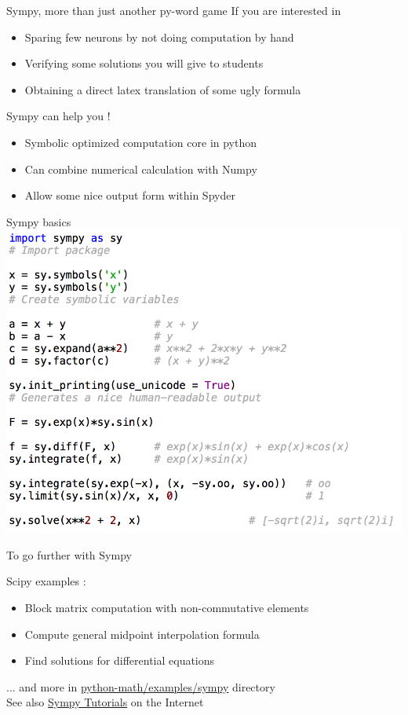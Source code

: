 \documentclass[11pt,unknownkeysallowed,usenames,dvipsnames]{beamer}
\begin{document}
\begin{frame}{Sympy, more than just another py-word game}
    If you are interested in
    \begin{itemize}
        \item Sparing few neurons by not doing computation by hand
        \item Verifying some solutions you will give to students
        \item Obtaining a direct latex translation of some ugly formula 
    \end{itemize}
    \begin{center}
        Sympy can help you !
    \end{center}
    \begin{itemize}
        \item Symbolic optimized computation core in python
        \item Can combine numerical calculation with Numpy
        \item Allow some nice output form within Spyder
    \end{itemize}
\end{frame}

\begin{frame}{Sympy basics}
	\includegraphics[width=0.9\linewidth]{code-sympy}
\end{frame}

\begin{frame}{To go further with Sympy}
	\begin{block}{Scipy examples :}
        \begin{itemize}
            \item Block matrix computation with non-commutative elements
            \item Compute general midpoint interpolation formula
            \item Find solutions for differential equations
        \end{itemize}
    \end{block}
    \vspace*{-7pt}
    ... and more in    
    \href{https://gitlab.unige.ch/Thibaut.Lunet/python-math/tree/master/examples/sympy}{python-math/examples/sympy} directory \\
    See also \href{http://docs.sympy.org/latest/tutorial/index.html}{Sympy Tutorials} on the Internet
\end{frame}
\end{document}
